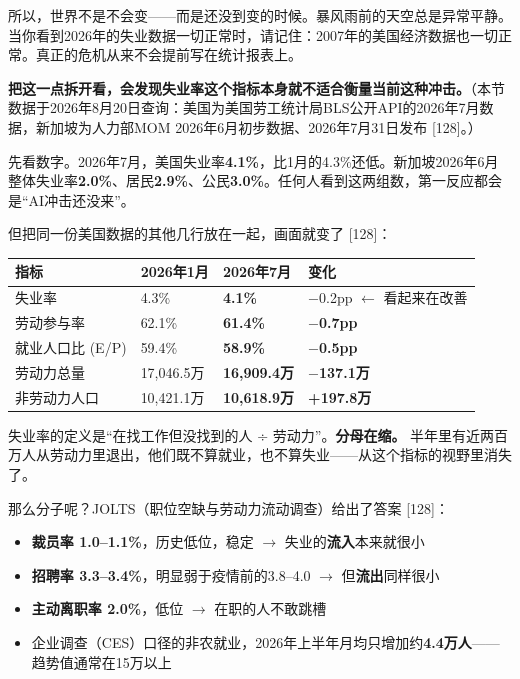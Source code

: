 \documentclass[11pt,a4paper]{ctexart}
\begin{document}
所以，世界不是不会变——而是还没到变的时候。暴风雨前的天空总是异常平静。当你看到2026年的失业数据一切正常时，请记住：2007年的美国经济数据也一切正常。真正的危机从来不会提前写在统计报表上。

\textbf{把这一点拆开看，会发现失业率这个指标本身就不适合衡量当前这种冲击。}（本节数据于2026年8月20日查询：美国为美国劳工统计局BLS公开API的2026年7月数据，新加坡为人力部MOM 2026年6月初步数据、2026年7月31日发布 [128]。）

先看数字。2026年7月，美国失业率\textbf{4.1\%}，比1月的4.3\%还低。新加坡2026年6月整体失业率\textbf{2.0\%}、居民\textbf{2.9\%}、公民\textbf{3.0\%}。任何人看到这两组数，第一反应都会是“AI冲击还没来”。

但把同一份美国数据的其他几行放在一起，画面就变了 [128]：

\begin{center}

\begin{tabularx}{\textwidth}{lXXX}
\toprule
指标 & 2026年1月 & 2026年7月 & 变化 \\
\midrule
失业率 & 4.3\% & \textbf{4.1\%} & $-$0.2pp $\leftarrow$ 看起来在改善 \\
劳动参与率 & 62.1\% & \textbf{61.4\%} & \textbf{$-$0.7pp} \\
就业人口比 (E/P) & 59.4\% & \textbf{58.9\%} & \textbf{$-$0.5pp} \\
劳动力总量 & 17,046.5万 & \textbf{16,909.4万} & \textbf{$-$137.1万} \\
非劳动力人口 & 10,421.1万 & \textbf{10,618.9万} & \textbf{+197.8万} \\
\bottomrule
\end{tabularx}
\end{center}

失业率的定义是“在找工作但没找到的人 ÷ 劳动力”。\textbf{分母在缩。} 半年里有近两百万人从劳动力里退出，他们既不算就业，也不算失业——从这个指标的视野里消失了。

那么分子呢？JOLTS（职位空缺与劳动力流动调查）给出了答案 [128]：

\begin{itemize}
  \item \textbf{裁员率 1.0–1.1\%}，历史低位，稳定 $\to$ 失业的\textbf{流入}本来就很小
  \item \textbf{招聘率 3.3–3.4\%}，明显弱于疫情前的3.8–4.0 $\to$ 但\textbf{流出}同样很小
  \item \textbf{主动离职率 2.0\%}，低位 $\to$ 在职的人不敢跳槽
  \item 企业调查（CES）口径的非农就业，2026年上半年月均只增加约\textbf{4.4万人}——趋势值通常在15万以上
\end{itemize}
\end{document}
